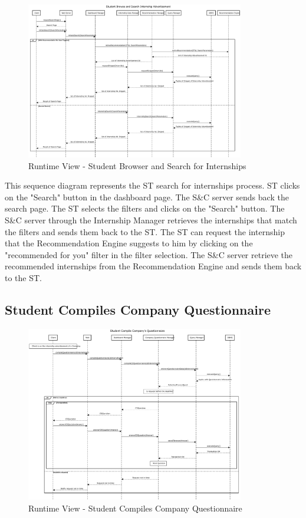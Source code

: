 \begin{figure}[H]
      \centering
      \includegraphics[width=0.85\textwidth]{Images/RV_03.pdf}
      \caption{Runtime View - Student Browser and Search for Internships}
      \label{fig:rv-student-browser-and-search-for-internships}
\end{figure}

\par This sequence diagram represents the ST search for internships process. ST clicks on the "Search" button in the dashboard
page. The S\&C server sends back the search page. The ST selects the filters and clicks on the "Search" button. The S\&C server
through the Internship Manager retrieves the internships that match the filters and sends them back to the ST. The ST can
request the internship that the Recommendation Engine suggests to him by clicking on the "recommended for you" filter in the
filter selection. The S\&C server retrieve the recommended internships from the Recommendation Engine and sends them back to the ST.


\subsection{Student Compiles Company Questionnaire}

\begin{figure}[H]
      \centering
      \includegraphics[width=0.85\textwidth]{Images/RV_04a.pdf}
      \caption{Runtime View - Student Compiles Company Questionnaire}
      \label{fig:rv-student-compiles-company-questionnaire}
\end{figure}

